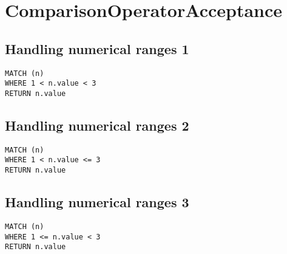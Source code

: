 \section{ComparisonOperatorAcceptance}

\subsection{Handling numerical ranges 1}

\begin{lstlisting}
MATCH (n)
WHERE 1 < n.value < 3
RETURN n.value
\end{lstlisting}

\subsection{Handling numerical ranges 2}

\begin{lstlisting}
MATCH (n)
WHERE 1 < n.value <= 3
RETURN n.value
\end{lstlisting}

\subsection{Handling numerical ranges 3}

\begin{lstlisting}
MATCH (n)
WHERE 1 <= n.value < 3
RETURN n.value
\end{lstlisting}

